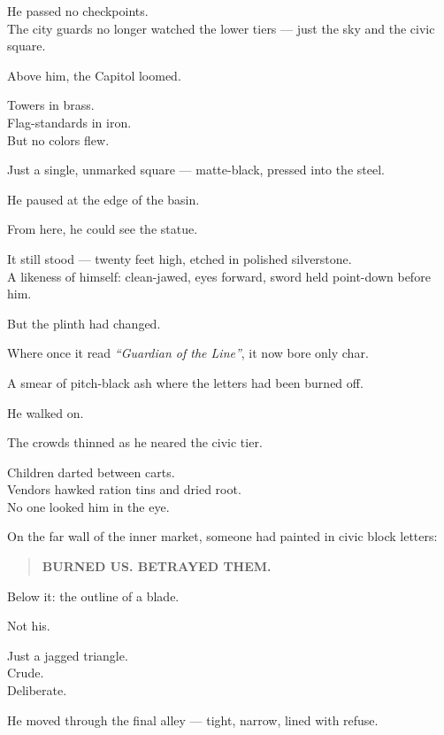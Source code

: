 \documentclass[12pt]{article}
\begin{document}
He passed no checkpoints.\\
The city guards no longer watched the lower tiers — just the sky and the civic square.

Above him, the Capitol loomed.

Towers in brass.\\
Flag-standards in iron.\\
But no colors flew.

Just a single, unmarked square — matte-black, pressed into the steel.

\vspace{1em}

He paused at the edge of the basin.

From here, he could see the statue.

It still stood — twenty feet high, etched in polished silverstone.\\
A likeness of himself: clean-jawed, eyes forward, sword held point-down before him.

But the plinth had changed.

Where once it read \textit{“Guardian of the Line”}, it now bore only char.

A smear of pitch-black ash where the letters had been burned off.

\vspace{1em}

He walked on.

The crowds thinned as he neared the civic tier.

Children darted between carts.\\
Vendors hawked ration tins and dried root.\\
No one looked him in the eye.

On the far wall of the inner market, someone had painted in civic block letters:

\begin{quote}
\textbf{BURNED US. BETRAYED THEM.}
\end{quote}

Below it: the outline of a blade.

Not his.

Just a jagged triangle.\\
Crude.\\
Deliberate.

\vspace{1em}

He moved through the final alley — tight, narrow, lined with refuse.
\end{document}
